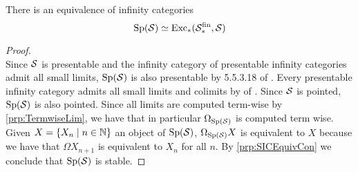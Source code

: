 \begin{thm}\label{thm:SpEquivEx} There is an equivalence of infinity categories $$\text{Sp}(\mathcal{S})\simeq\text{Exc}_\ast(\mathcal{S}_\ast^\text{fin},\mathcal{S})$$ 
\begin{proof}~\\
Since $\mathcal{S}$ is presentable and the infinity category of presentable infinity categories admit all small limits, $\text{Sp}(\mathcal{S})$ is also presentable by 5.5.3.18 of \cite{HTT}. Every presentable infinity category admits all small limits and colimits by of \cite{HTT}. Since $\mathcal{S}$ is pointed, $\text{Sp}(\mathcal{S})$ is also pointed. Since all limits are computed term-wise by \ref{prp:TermwiseLim}, we have that in particular $\Omega_{\text{Sp}(\mathcal{S})}$ is computed term wise. Given $X=\{X_n\;|\;n\in\mathbb{N}\}$ an object of $\text{Sp}(\mathcal{S})$, $\Omega_{\text{Sp}(\mathcal{S})}X$ is equivalent to $X$ because we have that $\Omega X_{n+1}$ is equivalent to $X_n$ for all $n$. By \ref{prp:SICEquivCon} we conclude that $\text{Sp}(\mathcal{S})$ is stable. 


\end{proof}
\end{thm}
